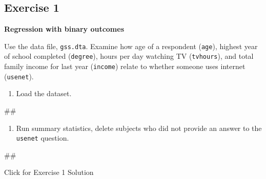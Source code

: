 \documentclass[
]{book}
\newenvironment{Shaded}{\begin{snugshade}}{\end{snugshade}}
\newcommand{\NormalTok}[1]{#1}
\providecommand{\tightlist}{%
  \setlength{\itemsep}{0pt}\setlength{\parskip}{0pt}}
\begin{document}
\hypertarget{exercise-1-8}{%
\subsection{Exercise 1}\label{exercise-1-8}}

\textbf{Regression with binary outcomes}

Use the data file, \texttt{gss.dta}. Examine how age of a respondent (\texttt{age}), highest year of school completed (\texttt{degree}), hours per day watching TV (\texttt{tvhours}), and total family income for last year (\texttt{income}) relate to whether someone uses internet (\texttt{usenet}).

\begin{enumerate}
\def\labelenumi{\arabic{enumi}.}
\tightlist
\item
  Load the dataset.
\end{enumerate}

\begin{Shaded}
\begin{Highlighting}[]
\NormalTok{\#\#}
\end{Highlighting}
\end{Shaded}

\begin{enumerate}
\def\labelenumi{\arabic{enumi}.}
\setcounter{enumi}{1}
\tightlist
\item
  Run summary statistics, delete subjects who did not provide an answer to the \texttt{usenet} question.
\end{enumerate}

\begin{Shaded}
\begin{Highlighting}[]
\NormalTok{\#\#}
\end{Highlighting}
\end{Shaded}

{Click for Exercise 1 Solution}
\end{document}
